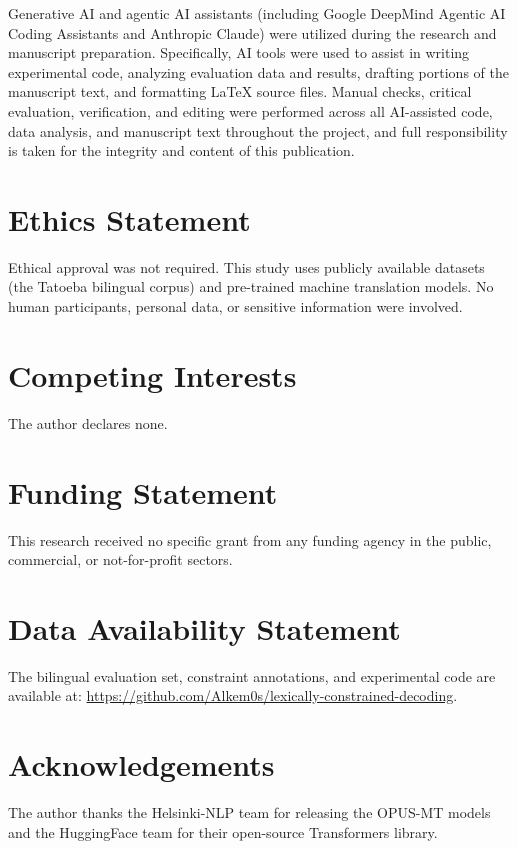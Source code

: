 \documentclass{CUP-JNL-NLP}
\begin{document}
Generative AI and agentic AI assistants (including Google DeepMind Agentic AI Coding Assistants and Anthropic Claude) were utilized during the research and manuscript preparation. Specifically, AI tools were used to assist in writing experimental code, analyzing evaluation data and results, drafting portions of the manuscript text, and formatting LaTeX source files. Manual checks, critical evaluation, verification, and editing were performed across all AI-assisted code, data analysis, and manuscript text throughout the project, and full responsibility is taken for the integrity and content of this publication.

\section*{Ethics Statement}

Ethical approval was not required. This study uses publicly available datasets (the
Tatoeba bilingual corpus) and pre-trained machine translation models. No human
participants, personal data, or sensitive information were involved.

\section*{Competing Interests}

The author declares none.

\section*{Funding Statement}

This research received no specific grant from any funding agency in the public,
commercial, or not-for-profit sectors.

\section*{Data Availability Statement}

The bilingual evaluation set, constraint annotations, and experimental code are
available at: \url{https://github.com/Alkem0s/lexically-constrained-decoding}.

\section*{Acknowledgements}

The author thanks the Helsinki-NLP team for releasing the OPUS-MT models and the
HuggingFace team for their open-source Transformers library.






\label{lastpage}
\end{document}
